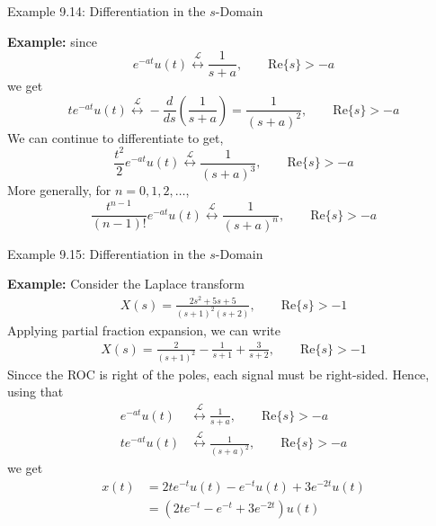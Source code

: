 \begin{frame}[t]{Example 9.14: Differentiation in the \texorpdfstring{$s$}{s}-Domain}

  \textbf{Example:}
  since
  \[
    e^{-at}u(t)
    \stackrel{\mathcal{L}}{\longleftrightarrow}
    \frac{1}{s+a},
    \qquad \text{Re}\{s\}>-a
  \]
  we get
  \[
    t e^{-at}u(t)
    \stackrel{\mathcal{L}}{\longleftrightarrow}
    -\frac{d}{ds} \left( \frac{1}{s+a} \right) =  \frac{1}{(s+a)^2},
    \qquad \text{Re}\{s\}>-a
  \]
  We can continue to differentiate to get,
  \[
    \frac{t^2}{2} e^{-at}u(t)
    \stackrel{\mathcal{L}}{\longleftrightarrow}
    \frac{1}{(s+a)^3},
    \qquad \text{Re}\{s\}>-a
  \]
  More generally, for $n=0,1,2,\ldots$,
  \[
    \frac{t^{n-1}}{(n-1)!} e^{-at}u(t)
    \stackrel{\mathcal{L}}{\longleftrightarrow}
    \frac{1}{(s+a)^{n}},
    \qquad \text{Re}\{s\}>-a
  \]
\end{frame}

\begin{frame}[t]{Example 9.15: Differentiation in the \texorpdfstring{$s$}{s}-Domain}

  \textbf{Example:}
  Consider the Laplace transform
  \begin{align*}
    X(s) = \frac{2s^2+5s+5}{(s+1)^2(s+2)}, \qquad \text{Re}\{s\}>-1
  \end{align*}
  Applying partial fraction expansion, we can write
  \begin{align*}
    X(s) = \frac{2}{\left(s+1\right)^2} - \frac{1}{s+1} + \frac{3}{s+2}, \qquad \text{Re}\{s\}>-1
  \end{align*}
  Sincce the ROC is right of the poles, each signal must be right-sided. Hence, using that
  \begin{align*}
    e^{-at}u(t) & \stackrel{\mathcal{L}}{\longleftrightarrow} \frac{1}{s+a}, \qquad \text{Re}\{s\}>-a \\
    t e^{-at}u(t) & \stackrel{\mathcal{L}}{\longleftrightarrow} \frac{1}{(s+a)^2}, \qquad \text{Re}\{s\}>-a
  \end{align*}
  we get
  \begin{align*}
    x(t) & = 2 t e^{-t}u(t) - e^{-t}u(t) + 3 e^{-2t}u(t) \\
    & = \left(2 t e^{-t} - e^{-t} + 3 e^{-2t}\right) u(t)
  \end{align*}
\end{frame}

